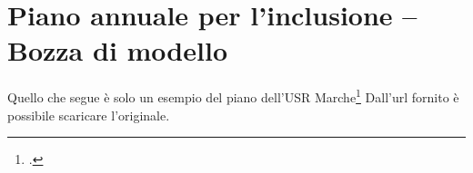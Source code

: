 \chapter{Piano annuale per l'inclusione – Bozza di modello}
\label{cha:PianoannualeperinclusioneBozzamodello}
 Quello che segue è solo un esempio  del piano dell'USR Marche\footcite{pai13b} Dall'url fornito è possibile scaricare l'originale.
 
